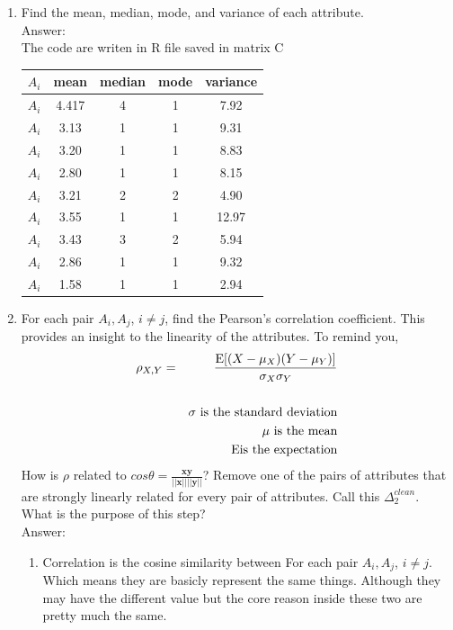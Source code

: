 \documentclass{article}
\begin{document}
\begin{enumerate}
\begin{enumerate}
 \item Find the mean, median, mode, and variance of each attribute.\\
 Answer:\\
 The code are writen in R file saved in matrix C
  \begin{center}
  	\begin{tabular}{ccccc}
     $A_i$ & mean&median&mode&variance\\ \hline \hline         
    $A_i$&4.417 &4 &1 &7.92\\
     $A_i$&3.13&1 &1&9.31\\
    $A_i$ &3.20&1&1 &8.83\\
    $A_i$ &2.80 &1 &1 &8.15\\
     $A_i$ &3.21&2 &2&4.90\\
    $A_i$ &3.55&1&1&12.97\\
    $A_i$ &3.43&3&2&5.94\\
    $A_i$ &2.86 &1&1&9.32\\
    $A_i$ &1.58 &1&1&2.94\\
    	\end{tabular}
    \end{center}
 \item For each pair $A_i, A_j$, $i \neq j$, find the Pearson's correlation coefficient. This provides an insight to the linearity of the attributes.  To remind you,
 \begin{eqnarray*}
 \rho_{X,Y} &=& \frac{\mathrm{E}[(X - \mu_X)(Y-\mu_Y)]}{\sigma_X\sigma_Y}\\
 &&\\
 &&\sigma\ \mbox{\rm is the standard deviation}\\
 && \mu\ \mbox{\rm is the mean} \\
 &&\ \mathrm{E} \mbox{\rm is the expectation}
 \end{eqnarray*}
 How is $\rho$ related to $cos \theta = \frac{\mathbf{x}\mathbf{y}}{||\mathbf{x}|| ||\mathbf{y}||}$?  Remove one of the pairs of attributes that are strongly linearly related for every pair of attributes.  Call this $\Delta_2^{clean}$.  What is the purpose of this step?\\
 Answer:\\
 \begin{enumerate}
 	\item Correlation is the cosine similarity between For each pair $A_i, A_j$, $i \neq j$. Which means they are basicly represent the same things. Although they may have the different value but the core reason inside these two are pretty much the same.

\end{enumerate}
\end{enumerate}
\end{enumerate}
\end{document}
